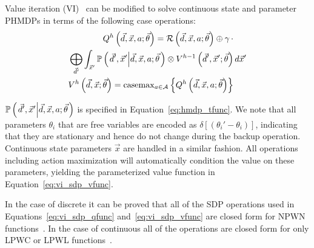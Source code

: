 Value iteration (VI)~\parencite{Bellman_PU_1957} can be modified to solve continuous state and parameter PHMDPs in terms of the following case operations:
{\footnotesize 
    \abovedisplayskip=0pt
    \belowdisplayskip=0pt
    \begin{align}
        Q^{h} \left( \vec{d}, \vec{x}, a; \vec{\theta} \right) = \mathcal{R} \left( \vec{d}, \vec{x}, a; \vec{\theta} \right) \oplus \gamma \, \cdot &  \nonumber \\ 
        \bigoplus_{\vec{d}'} \int_{\vec{x}'} \mathbb{P}\left({ \left. \vec{d}', \vec{x}' \middle| \vec{d}, \vec{x}, a; \vec{\theta} \right.}\right) \otimes V^{h-1} \left( \vec{d}', \vec{x}'; \vec{\theta} \right) & \, d\vec{x}'  \label{eq:vi_sdp_qfunc} \\
        V^{h}\left( \vec{d}, \vec{x}; \vec{\theta} \right) = \mathrm{casemax}_{a \in \mathcal{A}} \left\{ Q^{h} \left( \vec{d}, \vec{x}, a; \vec{\theta} \right) \right\} & \label{eq:vi_sdp_vfunc}
    \end{align}
}%

{\footnotesize $\mathbb{P}\left({\left. \vec{d}', \vec{x}' \middle| \vec{d}, \vec{x}, a; \vec{\theta} \right.}\right)$ } is specified in Equation~\eqref{eq:hmdp_tfunc}. We note that all parameters {\footnotesize $\theta_i$} that are free variables 
are encoded as {\footnotesize $\delta\left[\left(\theta_i' - \theta_i\right)\right]$}, indicating that they are stationary and hence do not change during the backup operation. Continuous state parameters {\footnotesize $ \vec{x} $} are handled in a similar fashion. All operations including action maximization will automatically condition the value on these parameters, yielding the parameterized value function in Equation~\eqref{eq:vi_sdp_vfunc}.

In the case of discrete {\footnotesize \Action} it can be proved that all of the SDP operations used in Equations~\eqref{eq:vi_sdp_qfunc} and~\eqref{eq:vi_sdp_vfunc} are closed form for NPWN functions~\parencite{Sanner_UAI_2011}. In the case of continuous {\footnotesize \Action} all of the operations are closed form for only LPWC or LPWL functions~\parencite{Zamani_AAAI_2012}.

